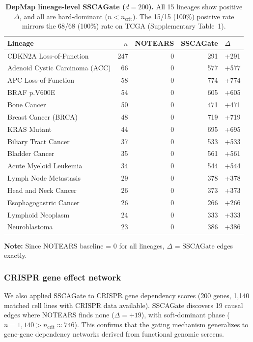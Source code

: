 \documentclass[12pt,a4paper]{article}
\begin{document}
\begin{table}[htbp]
\centering
\caption{\textbf{DepMap lineage-level SSCAGate ($d = 200$).}
All 15 lineages show positive $\Delta$, and all are hard-dominant
($n < n_{\text{crit}}$). The 15/15 (100\%) positive rate mirrors
the 68/68 (100\%) rate on TCGA (Supplementary Table~1).}
\label{tab:depmap_lineage}
\small
\begin{tabular}{lrrrl}
\toprule
Lineage & $n$ & NOTEARS & SSCAGate & $\Delta$ \\
\midrule
CDKN2A Loss-of-Function & 247 & 0 & 291 & +291 \\
Adenoid Cystic Carcinoma (ACC) & 66 & 0 & 577 & +577 \\
APC Loss-of-Function & 58 & 0 & 774 & +774 \\
BRAF p.V600E & 54 & 0 & 605 & +605 \\
Bone Cancer & 50 & 0 & 471 & +471 \\
Breast Cancer (BRCA) & 48 & 0 & 719 & +719 \\
KRAS Mutant & 44 & 0 & 695 & +695 \\
Biliary Tract Cancer & 37 & 0 & 533 & +533 \\
Bladder Cancer & 35 & 0 & 561 & +561 \\
Acute Myeloid Leukemia & 34 & 0 & 544 & +544 \\
Lymph Node Metastasis & 29 & 0 & 378 & +378 \\
Head and Neck Cancer & 26 & 0 & 373 & +373 \\
Esophagogastric Cancer & 26 & 0 & 266 & +266 \\
Lymphoid Neoplasm & 24 & 0 & 333 & +333 \\
Neuroblastoma & 23 & 0 & 386 & +386 \\
\bottomrule
\end{tabular}
\vspace{4pt}
{\footnotesize \textbf{Note:} Since NOTEARS baseline = 0 for all lineages, $\Delta$ = SSCAGate edges exactly.}
\end{table}

\subsubsection*{CRISPR gene effect network}

We also applied SSCAGate to CRISPR gene dependency scores (200 genes,
1,140 matched cell lines with CRISPR data available). SSCAGate discovers 19 causal edges where
NOTEARS finds none ($\Delta = +19$), with soft-dominant phase
($n = 1{,}140 > n_{\text{crit}} \approx 746$). This confirms that
the gating mechanism generalizes to gene-gene dependency networks
derived from functional genomic screens.
\end{document}
